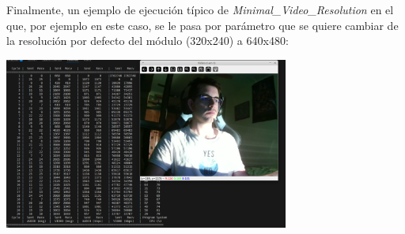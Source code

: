 \newpage

Finalmente, un ejemplo de ejecución típico de \textit{Minimal\_Video\_Resolution} en el que, por ejemplo en este caso, se le pasa por parámetro que se quiere cambiar de la resolución por defecto del módulo (320x240) a 640x480:
\begin{center}
	\includegraphics[width = 0.7\textwidth]{images/pruebas/ejecuion_normal_resolution.png}
	\label{fig:ejecucion_resolution}
\end{center}
\vspace{\baselineskip}

